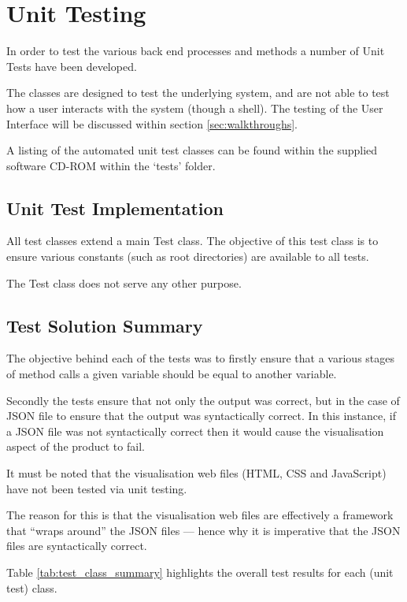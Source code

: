 \section{Unit Testing}
\label{sec:unit_testing}

In order to test the various back end processes and methods a number of Unit 
Tests have been developed.

The classes are designed to test the underlying system, and are not able to 
test how a user interacts with the system (though a shell). The testing of the 
User Interface will be discussed within section \ref{sec:walkthroughs}.

A listing of the automated unit test classes can be found within the supplied 
software CD-ROM within the `tests' folder.

\subsection{Unit Test Implementation}

All test classes extend a main {\ttfamily Test} class. The objective of this 
test class is to ensure various constants (such as root directories) are 
available to all tests.

The Test class does not serve any other purpose.

\subsection{Test Solution Summary}
The objective behind each of the tests was to firstly ensure that a various 
stages of method calls a given variable should be equal to another variable. 

Secondly the tests ensure that not only the output was correct, but in the case
of JSON file to ensure that the output was syntactically correct. In this 
instance, if a JSON file was not syntactically correct then it would cause the 
visualisation aspect of the product to fail.

It must be noted that the visualisation web files (HTML, CSS and JavaScript) 
have not been tested via unit testing.

The reason for this is that the visualisation web files are effectively a 
framework that ``wraps around'' the JSON files --- hence why it is imperative 
that the JSON files are syntactically correct.

Table \ref{tab:test_class_summary} highlights the overall test results for each 
(unit test) class.

